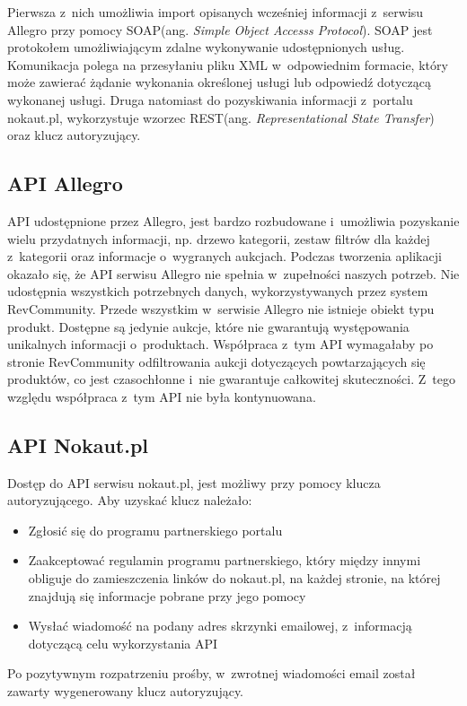 Pierwsza z~nich umożliwia import opisanych wcześniej informacji z~serwisu Allegro przy pomocy SOAP(ang. \textit{Simple Object Accesss Protocol}). SOAP jest protokołem umożliwiającym zdalne wykonywanie udostępnionych usług. Komunikacja polega na przesyłaniu pliku XML w~odpowiednim formacie, który może zawierać żądanie wykonania określonej usługi lub odpowiedź dotyczącą wykonanej usługi.\cite{soap} \indent Druga natomiast do pozyskiwania informacji z~portalu nokaut.pl, wykorzystuje wzorzec REST(ang. \textit{Representational State Transfer}) oraz klucz autoryzujący.

\subsection{API Allegro}
API udostępnione przez Allegro, jest bardzo rozbudowane i~umożliwia pozyskanie wielu przydatnych informacji, np. drzewo kategorii, zestaw filtrów dla każdej z~kategorii oraz informacje o~wygranych aukcjach.
Podczas tworzenia aplikacji okazało się, że API serwisu Allegro nie spełnia w~zupełności naszych potrzeb.
Nie udostępnia wszystkich potrzebnych danych, wykorzystywanych przez system RevCommunity. Przede wszystkim w~serwisie Allegro nie istnieje obiekt typu produkt. Dostępne są jedynie aukcje, które nie gwarantują występowania unikalnych informacji o~produktach. Współpraca z~tym API wymagałaby po stronie RevCommunity odfiltrowania aukcji dotyczących powtarzających się produktów, co jest czasochłonne i~nie gwarantuje całkowitej skuteczności. Z~tego względu współpraca z~tym API nie była kontynuowana.

\subsection{API Nokaut.pl}
Dostęp do API serwisu nokaut.pl, jest możliwy przy pomocy klucza autoryzującego. Aby uzyskać klucz należało:
\begin{itemize}
\item Zgłosić się do programu partnerskiego portalu
\item Zaakceptować regulamin programu partnerskiego, który między innymi obliguje do zamieszczenia linków do nokaut.pl, na każdej stronie, na której znajdują się informacje pobrane przy jego pomocy
\item Wysłać wiadomość na podany adres skrzynki emailowej, z~informacją dotyczącą celu wykorzystania API
\end{itemize}
Po pozytywnym rozpatrzeniu prośby, w~zwrotnej wiadomości email został zawarty wygenerowany klucz autoryzujący.

